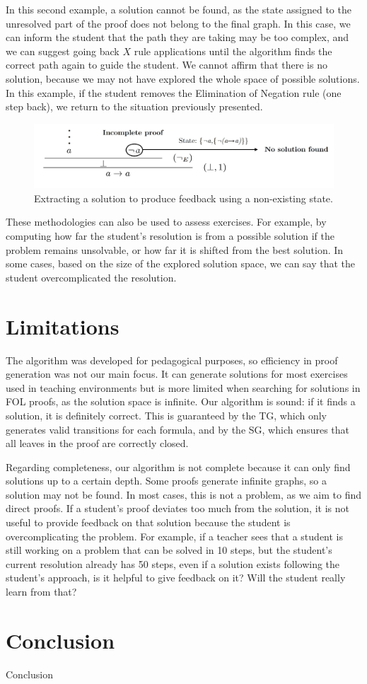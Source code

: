 \documentclass[runningheads]{llncs}
\begin{document}
In this second example, a solution cannot be found, as the state assigned to the unresolved part of the proof does not belong to the final graph. In this case, we can inform the student that the path they are taking may be too complex, and we can suggest going back \(X\) rule applications until the algorithm finds the correct path again to guide the student. We cannot affirm that there is no solution, because we may not have explored the whole space of possible solutions. In this example, if the student removes the Elimination of Negation rule (one step back), we return to the situation previously presented.

\vspace{-1em}
\begin{figure}[H]
    \centering
    \includegraphics[width=1\linewidth]{resources/trim-neg-feed.jpg}
    \caption{Extracting a solution to produce feedback using a non-existing state.}
    \label{fig:extract-solution2}
\end{figure}
\vspace{-2em}

These methodologies can also be used to assess exercises. For example, by computing how far the student’s resolution is from a possible solution if the problem remains unsolvable, or how far it is shifted from the best solution. In some cases, based on the size of the explored solution space, we can say that the student overcomplicated the resolution.

\section{Limitations}
The algorithm was developed for pedagogical purposes, so efficiency in proof generation was not our main focus. It can generate solutions for most exercises used in teaching environments but is more limited when searching for solutions in FOL proofs, as the solution space is infinite. Our algorithm is sound: if it finds a solution, it is definitely correct. This is guaranteed by the TG, which only generates valid transitions for each formula, and by the SG, which ensures that all leaves in the proof are correctly closed.

Regarding completeness, our algorithm is not complete because it can only find solutions up to a certain depth. Some proofs generate infinite graphs, so a solution may not be found. In most cases, this is not a problem, as we aim to find direct proofs. If a student’s proof deviates too much from the solution, it is not useful to provide feedback on that solution because the student is overcomplicating the problem. For example, if a teacher sees that a student is still working on a problem that can be solved in 10 steps, but the student’s current resolution already has 50 steps, even if a solution exists following the student’s approach, is it helpful to give feedback on it? Will the student really learn from that? 


\section{Conclusion}
Conclusion


\end{document}

